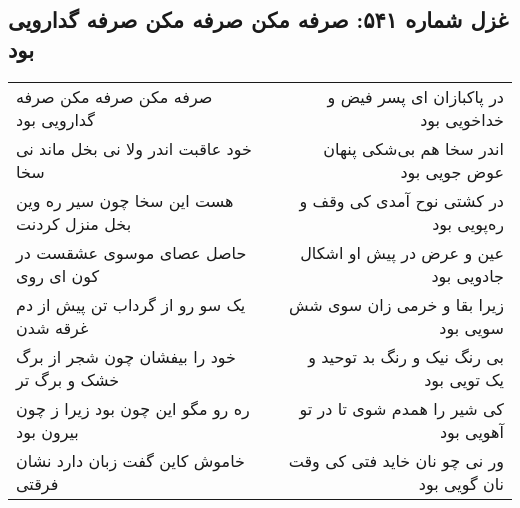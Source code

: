 \begin{center}
\section*{غزل شماره ۵۴۱: صرفه مکن صرفه مکن صرفه گدارویی بود}
\label{sec:0541}
\begin{longtable}{l p{0.5cm} r}
صرفه مکن صرفه مکن صرفه گدارویی بود
&&
در پاکبازان ای پسر فیض و خداخویی بود
\\
خود عاقبت اندر ولا نی بخل ماند نی سخا
&&
اندر سخا هم بی‌شکی پنهان عوض جویی بود
\\
هست این سخا چون سیر ره وین بخل منزل کردنت
&&
در کشتی نوح آمدی کی وقف و ره‌پویی بود
\\
حاصل عصای موسوی عشقست در کون ای روی
&&
عین و عرض در پیش او اشکال جادویی بود
\\
یک سو رو از گرداب تن پیش از دم غرقه شدن
&&
زیرا بقا و خرمی زان سوی شش سویی بود
\\
خود را بیفشان چون شجر از برگ خشک و برگ تر
&&
بی رنگ نیک و رنگ بد توحید و یک تویی بود
\\
ره رو مگو این چون بود زیرا ز چون بیرون بود
&&
کی شیر را همدم شوی تا در تو آهویی بود
\\
خاموش کاین گفت زبان دارد نشان فرقتی
&&
ور نی چو نان خاید فتی کی وقت نان گویی بود
\\
\end{longtable}
\end{center}
